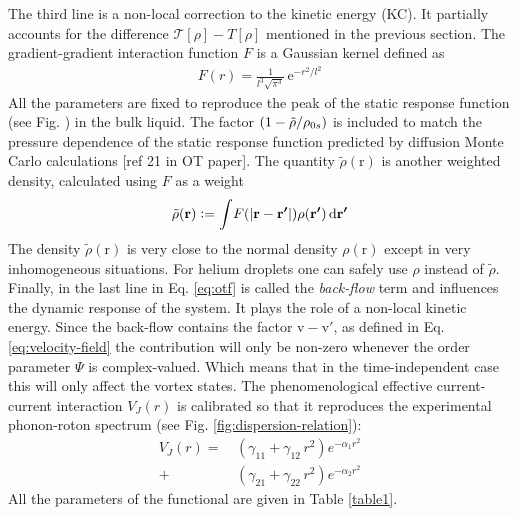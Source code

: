 \documentclass[12pt,a4paper,twosides]{book}
\renewcommand{\vec}[1]{\bm{\mathrm{#1}}}
\newcommand{\unit}[1]{\,\mathrm{#1}}
\newcommand{\diff}[1]{\,\mathrm{d}{\vec{#1}}}
\begin{document}
		The third line is a non-local correction to the kinetic energy (KC). It partially accounts for the difference $\mathcal{T}[\rho]-T[\rho]$ mentioned in the previous section. The gradient-gradient interaction function $F$ is a Gaussian kernel defined as
		\begin{align}
			F(r) = \frac{1}{l^3\sqrt{\pi^3}}\unit{e}^{-r^2/l^2}
		\end{align}
		All the parameters are fixed to reproduce the peak of the static response function (see Fig.  ) in the bulk liquid. The factor $\qty(1-\tilde{\rho}/\rho_{0s})$ is included to match the pressure dependence of the static response function predicted by diffusion Monte Carlo calculations [ref 21 in OT paper]. The quantity $\tilde{\rho}(\vec{r})$ is another weighted density, calculated using $F$ as a weight
		\begin{align}
			\tilde{\rho}(\vec{r}) \vcentcolon= \int\!F\qty(\abs{\vec{r}-\vec{r'}})\rho(\vec{r'})\diff{r'}
		\end{align}
		The density $\tilde{\rho}(\vec{r})$ is very close to the normal density $\rho(\vec{r})$ except in very inhomogeneous situations. For helium droplets one can safely use $\rho$ instead of $\tilde{\rho}$.\\
			
		Finally, in the last line in Eq. \ref{eq:otf} is called the \emph{back-flow} term and influences the dynamic response of the system. It plays the role of a non-local kinetic energy. Since the back-flow contains the factor $\vec{v}-\vec{v'}$, as defined in Eq. \ref{eq:velocity-field} the contribution will only be non-zero whenever the order parameter $\Psi$ is complex-valued. Which means that in the time-independent case this will only affect the vortex states. The phenomenological effective current-current interaction $V_J(r)$ is calibrated so that it reproduces the experimental phonon-roton spectrum (see Fig. \ref{fig:dispersion-relation}):
		\begin{align}
			V_J(r) =\,&(\gamma_{11} +\gamma_{12} \, r^2) e^{-\alpha_1 r^2}\\
				+\,&(\gamma_{21} +\gamma_{22} \, r^2) e^{-\alpha_2 r^2}
			\label{eq15}
		\end{align}
		All the parameters of the functional are given in Table \ref{table1}.
\end{document}
